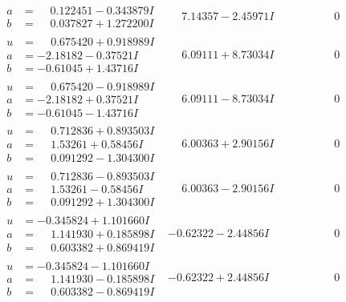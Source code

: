 \documentclass[1p]{elsarticle_modified}
\theoremstyle{definition}
\begin{document}
$$\begin{array}{c|c|c}
\begin{aligned}
a &= \phantom{-}0.122451 - 0.343879 I \\
b &= \phantom{-}0.037827 + 1.272200 I\end{aligned}
 & \phantom{-}7.14357 - 2.45971 I & \phantom{-0.000000 } 0 \\ \hline\begin{aligned}
u &= \phantom{-}0.675420 + 0.918989 I \\
a &= -2.18182 - 0.37521 I \\
b &= -0.61045 + 1.43716 I\end{aligned}
 & \phantom{-}6.09111 + 8.73034 I & \phantom{-0.000000 } 0 \\ \hline\begin{aligned}
u &= \phantom{-}0.675420 - 0.918989 I \\
a &= -2.18182 + 0.37521 I \\
b &= -0.61045 - 1.43716 I\end{aligned}
 & \phantom{-}6.09111 - 8.73034 I & \phantom{-0.000000 } 0 \\ \hline\begin{aligned}
u &= \phantom{-}0.712836 + 0.893503 I \\
a &= \phantom{-}1.53261 + 0.58456 I \\
b &= \phantom{-}0.091292 - 1.304300 I\end{aligned}
 & \phantom{-}6.00363 + 2.90156 I & \phantom{-0.000000 } 0 \\ \hline\begin{aligned}
u &= \phantom{-}0.712836 - 0.893503 I \\
a &= \phantom{-}1.53261 - 0.58456 I \\
b &= \phantom{-}0.091292 + 1.304300 I\end{aligned}
 & \phantom{-}6.00363 - 2.90156 I & \phantom{-0.000000 } 0 \\ \hline\begin{aligned}
u &= -0.345824 + 1.101660 I \\
a &= \phantom{-}1.141930 + 0.185898 I \\
b &= \phantom{-}0.603382 + 0.869419 I\end{aligned}
 & -0.62322 - 2.44856 I & \phantom{-0.000000 } 0 \\ \hline\begin{aligned}
u &= -0.345824 - 1.101660 I \\
a &= \phantom{-}1.141930 - 0.185898 I \\
b &= \phantom{-}0.603382 - 0.869419 I\end{aligned}
 & -0.62322 + 2.44856 I & \phantom{-0.000000 } 0 \\ \hline\begin{aligned}

\end{aligned}
\end{array}$$
\end{document}
